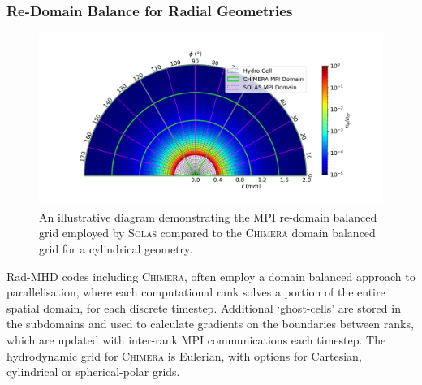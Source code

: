 \subsubsection{Re-Domain Balance for Radial Geometries}

\begin{figure}[t!]
    \includegraphics[width=\linewidth]{Numerics/Images/SOLAS_CHIMERA_domain.png}
    \centering
    \caption{An illustrative diagram demonstrating the MPI re-domain balanced grid employed by \textsc{Solas} compared to the \textsc{Chimera} domain balanced grid for a cylindrical geometry.}%
    \label{fig:SOLAS_CHIMERA_domain}
\end{figure}

\ac{Rad-MHD} codes including \textsc{Chimera}, often employ a domain balanced approach to parallelisation, where each computational rank solves a portion of the entire spatial domain, for each discrete timestep.
Additional `ghost-cells' are stored in the subdomains and used to calculate gradients on the boundaries between ranks, which are updated with inter-rank \ac{MPI} communications each timestep.
The hydrodynamic grid for \textsc{Chimera} is Eulerian, with options for Cartesian, cylindrical or spherical-polar grids.

